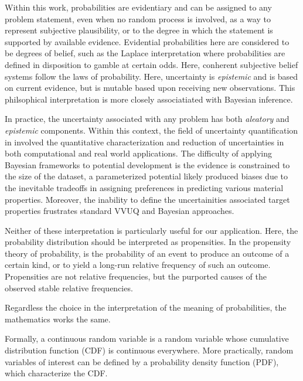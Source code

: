 Within this work, probabilities are evidentiary and can be assigned to any problem statement, even when no random process is involved, as a way to represent subjective plausibility, or to the degree in which the statement is supported by available evidence.  Evidential probabilities here are considered to be degrees of belief, such as the Laplace interpretation where probabilities are defined in disposition to gamble at certain odds\cite{laplace}.  Here, conherent subjective belief systems follow the laws of probability\cite{ramsey_probability,definetti_probability}.  Here, uncertainty is \emph{epistemic} and is based on current evidence, but is mutable based upon receiving new observations\cite{ramsey2016truth,definetti1980_foresight,jaynes2003_probability}.  This philsophical interpretation is more closely associatiated with Bayesian inference.

In practice, the uncertainty associated with any problem has both \emph{aleatory} and \emph{epistemic} components.  Within this context, the field of uncertainty quantification\cite{oberkamph} in involved the quantitative characterization and reduction of uncertainties in both computational and real world applications.  The difficulty of applying Bayesian frameworks to potential development is the evidence is constrained to the size of the dataset, a parameterized potential likely produced biases due to the inevitable tradeoffs in assigning preferences in predicting various material properties.  Moreover, the inability to define the uncertainities associated target properties frustrates standard VVUQ and Bayesian approaches.

 Neither of these interpretation is particularly useful for our application.  Here, the probability distribution should be interpreted as propensities.  In the propensity theory of probability, is the probability of an event to produce an outcome of a certain kind, or to yield a long-run relative frequency of such an outcome.  Propensities are not relative frequencies, but the purported causes of the observed stable relative frequencies.

Regardless the choice in the interpretation of the meaning of probabilities, the mathematics works the same.

Formally, a continuous random variable is a random variable whose cumulative distribution function (CDF) is continuous everywhere\cite{bertsekas2002_probabilitytheory}.  More practically, random variables of interest can be defined by a probability density function (PDF), which characterize the CDF.

